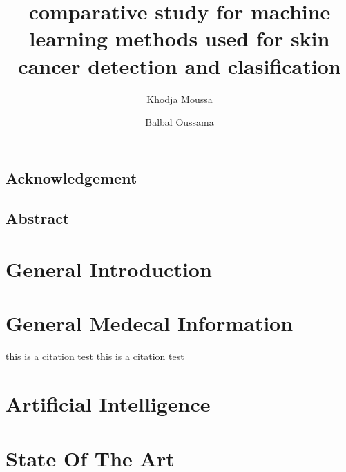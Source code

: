 \documentclass[12pt,a4paper]{report}
\title{comparative study for machine learning methods used for skin cancer detection and clasification}
\author{
	Khodja Moussa
	\and
	Balbal Oussama
}
\date{}
\begin{document}


\section*{Acknowledgement}
\newpage
\section*{Abstract}
\newpage
\tableofcontents
\listoffigures
\listoftables
\newpage

\chapter{General Introduction}

\chapter{General Medecal Information}


this is a citation test \cite{elin2018}
this is a citation test \cite{eliana2022} \cite{whatiscancer2021}

\chapter{Artificial Intelligence}

\chapter{State Of The Art}





\end{document}
